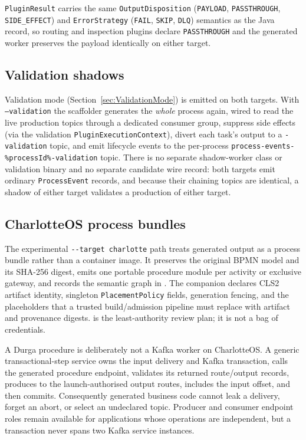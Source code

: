 \texttt{PluginResult} carries the same \texttt{OutputDisposition}
(\texttt{PAYLOAD}, \texttt{PASSTHROUGH}, \texttt{SIDE\_EFFECT}) and
\texttt{ErrorStrategy} (\texttt{FAIL}, \texttt{SKIP}, \texttt{DLQ}) semantics as
the Java record, so routing and inspection plugins declare \texttt{PASSTHROUGH}
and the generated worker preserves the payload identically on either target.

\subsection{Validation shadows}

Validation mode (Section~\ref{sec:ValidationMode}) is emitted on both targets. With
\texttt{--validation} the scaffolder generates the \emph{whole} process again, wired to
read the live production topics through a dedicated consumer group, suppress side effects
(via the validation \texttt{PluginExecutionContext}), divert each task's output to a
\texttt{-validation} topic, and emit lifecycle events to the per-process
\texttt{process-events-\%processId\%-validation} topic. There is no separate shadow-worker class or validation
binary and no separate candidate wire record: both targets emit ordinary
\texttt{ProcessEvent} records, and because their chaining topics are identical, a shadow
of either target validates a production of either target.

\subsection{CharlotteOS process bundles}
\label{sec:CharlotteTarget}

The experimental \texttt{-{}-target charlotte} path treats generated output as a
process bundle rather than a container image. It preserves the original BPMN
model and its SHA-256 digest, emits one portable procedure module per activity
or exclusive gateway, and records the semantic graph in
. The companion
 declares CLS2 artifact identity, singleton
\texttt{PlacementPolicy} fields, generation fencing, and the placeholders that a
trusted build/admission pipeline must replace with artifact and provenance
digests.  is the least-authority review
plan; it is not a bag of credentials.

A Durga procedure is deliberately not a Kafka worker on CharlotteOS. A generic
transactional-step service owns the input delivery and Kafka transaction, calls
the generated procedure endpoint, validates its returned route/output records,
produces to the launch-authorised output routes, includes the input offset, and
then commits. Consequently generated business code cannot leak a delivery,
forget an abort, or select an undeclared topic. Producer and consumer endpoint
roles remain available for applications whose operations are independent, but
a transaction never spans two Kafka service instances.

